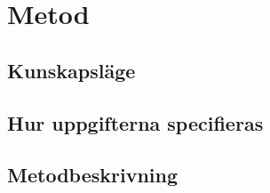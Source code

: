 \documentclass[11pt,a4paper,oneside]{book}
\begin{document}
\chapter{Metod}
\section{Kunskapsläge}


\section{Hur uppgifterna specifieras}



\section{Metodbeskrivning}

\newpage



\end{document}
